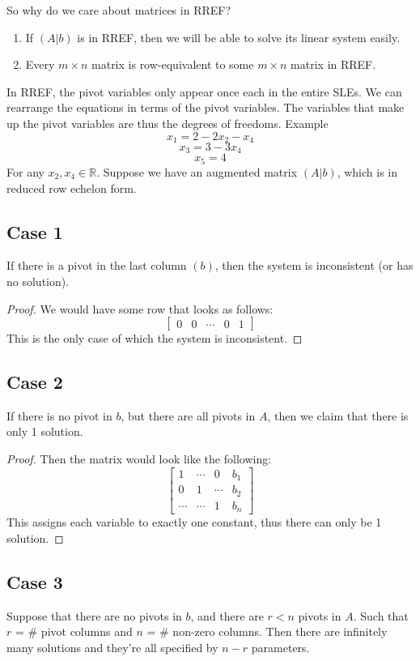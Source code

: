 \documentclass{article}
\newtheorem{one minute paper}[theorem]{One Minute Paper}
\begin{document}
So why do we care about matrices in RREF?
\begin{enumerate}
    \item If $(A|b)$ is in RREF, then we will be able to solve its linear system easily.
    \item Every $m \times n$ matrix is row-equivalent to some $m\times n$ matrix in RREF. 
\end{enumerate}
In RREF, the pivot variables only appear once each in the entire SLEs. We can rearrange the equations in terms of the pivot variables. The variables that make up the pivot variables are thus the degrees of freedoms. Example
\begin{equation}
    x_1 = 2 - 2x_2 - x_4
\end{equation} 
\begin{equation}
    x_3 = 3 - 3x_4
\end{equation}
\begin{equation}
    x_5 = 4
\end{equation}
For any $x_2, x_4 \in \mathbb{R}$. Suppose we have an augmented matrix $(A|b)$, which is in reduced row echelon form. 

\subsection*{Case 1} If there is a pivot in the last column $(b)$, then the system is inconsistent (or has no solution).
\begin{proof}
    We would have some row that looks as follows:
    \[\left[
        \begin{array}{cccc|c}
            0 & 0 & \cdots & 0 & 1
        \end{array}
        \right]
    \]
    This is the only case of which the system is inconsistent. 
\end{proof} 
\subsection*{Case 2} If there is no pivot in $b$, but there are all pivots in $A$, then we claim that there is only 1 solution.
\begin{proof}
    Then the matrix would look like the following:
    \[\left[
        \begin{array}{ccc|c}
            1 & \cdots & 0 & b_1 \\
            0 & 1 & \cdots & b_2 \\
            \cdots & \cdots & 1 & b_n 
        \end{array}
    \right]\]
    This assigns each variable to exactly one constant, thus there can only be 1 solution.  
\end{proof}

\subsection*{Case 3} Suppose that there are no pivots in $b$, and there are $r<n$ pivots in $A$. Such that $r$ = \# pivot columns and $n$ = \# non-zero columns. 
Then there are infinitely many solutions and they're all specified by $n-r$ parameters. 
\end{document}
